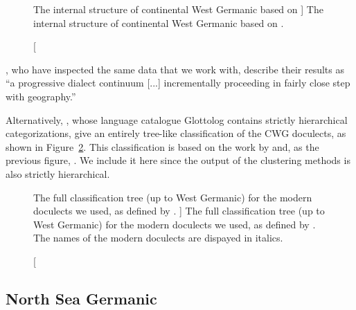 \documentclass[a4paper]{article}
\begin{document}
\begin{figure}[H]
\centering

\caption
[The internal structure of continental West Germanic
based on \citet{harbert2007germanic}]
{The internal structure of continental West Germanic
based on \citet[p. 8]{harbert2007germanic}.}
\label{fig:cwg_harbert}
\end{figure}

\citet{heggarty2010splits}, who have inspected the same data
that we work with, describe their results as
``a progressive dialect continuum [...] incrementally proceeding in fairly close step
with geography.''

Alternatively, \citet{hammarstroem2018glottolog},
whose language catalogue Glottolog contains strictly hierarchical categorizations,
give an entirely tree-like classification of the CWG doculects,
as shown in Figure~\ref{fig:glottolog}.
This classification is based on the work by \citet{stiles2013pan-west}
and, as the previous figure, \citet{harbert2007germanic}.
We include it here since the output of the clustering methods
is also strictly hierarchical.

\begin{figure}[H]
\begin{adjustwidth}{-10cm}{-10cm}
\centering
\scalebox{0.8}{

}
\end{adjustwidth}
% 
\caption
[
The full classification tree (up to West Germanic) for the modern doculects we used,
as defined by \citet{hammarstroem2018glottolog}.
]
{
The full classification tree (up to West Germanic) for the modern doculects we used,
as defined by \citet{hammarstroem2018glottolog}.
The names of the modern doculects are dispayed in italics.
}
\label{fig:glottolog}
\end{figure}

\subsection{North Sea Germanic}
\end{document}
